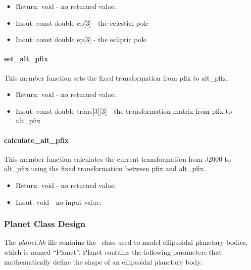 \begin{itemize}
\item{Return:} void - no returned value.
\item{Inout:} const double cp[3] - the celestial pole
\item{Inout:} const double ep[3] - the ecliptic pole
\end{itemize}

\paragraph{set\_alt\_pfix}

This member function sets the fixed transformation from pfix to alt\_pfix.

\begin{itemize}
\item{Return:} void - no returned value.
\item{Inout:} const double trans[3][3] - the transformation matrix from pfix
to alt\_pfix
\end{itemize}

\paragraph{calculate\_alt\_pfix}

This member function calculates the current transformation from J2000 to
alt\_pfix using the fixed transformation between pfix and alt\_pfix.

\begin{itemize}
\item{Return:} void - no returned value.
\item{Inout:} void - no input value.
\end{itemize}

\subsubsection{Planet Class Design}

The {\em planet.hh} file contains the \planetDesc\ class used to model
ellipsoidal planetary bodies, which is named ``Planet''.  Planet contains the
following parameters that mathematically define the shape of an ellipsoidal
planetary body:

